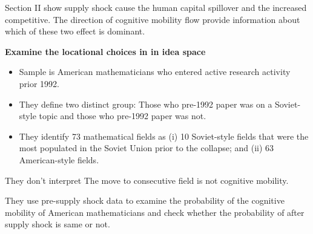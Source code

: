 \documentclass[../root]{subfiles}
\begin{document}
   Section II show supply shock cause the human capital spillover and the increased competitive.
   The direction of cognitive mobility flow provide information about which of these two effect is dominant.
   
   {\bf Examine the locational choices in in idea space}
   \begin{itemize}
        \item Sample is American mathematicians who entered active research activity prior 1992.
        \item They define two distinct group: Those who pre-1992 paper was on a Soviet-style topic and those who pre-1992 paper was not.
        \item They identify 73 mathematical fields as (i) 10 Soviet-style fields that were the most populated in the Soviet Union prior to the collapse; and (ii) 63 American-style fields.
    \end{itemize}
   
   They don't interpret The move to consecutive field is not cognitive mobility.
   
   They use pre-supply shock data to examine the probability of the cognitive mobility of American mathematicians and check whether the probability of after supply shock  is same or not.
   
\end{document}
